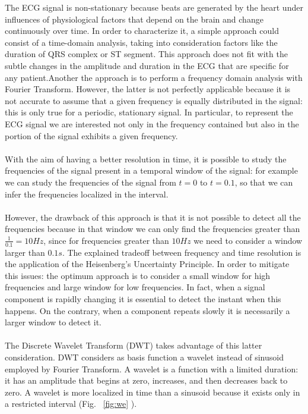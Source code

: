 \documentclass[LaM,binding=0.6cm]{sapthesis}
\begin{document}
The ECG signal is non-stationary because beats are generated by the heart under influences of physiological factors that depend on the brain and change continuously over time. In order to characterize it, a simple approach could consist of a time-domain analysis, taking into consideration factors like the duration of QRS complex or ST segment. This approach does not fit with the subtle changes in the amplitude and duration in the ECG that are specific for any patient.Another the approach is to perform a frequency domain analysis with Fourier Transform. However, the latter is not perfectly applicable because it is not accurate to assume that a given frequency is equally distributed in the signal: this is only true for a periodic, stationary signal. In particular, to represent the ECG signal we are interested not only in the frequency contained but also in the portion of the signal exhibits a given frequency.\\\\With the aim of having a better resolution in time, it is possible to study the frequencies of the signal present in a temporal window of the signal: for example we can study the frequencies of the signal from $t=0$ to $t=0.1$, so that we can infer the frequencies localized in the interval.\\\\However, the drawback of this approach is that it is not possible to detect all the frequencies because in that window we can only find the frequencies greater than $\frac{1}{0.1}=10 Hz$, since for frequencies greater than $10 Hz$ we need to consider a window larger than $0.1s$. The explained tradeoff between frequency and time resolution is the application of the Heisenberg's Uncertainty Principle. In order to mitigate this issues: the optimum approach is to consider a small window for high frequencies and large window for low frequencies. In fact, when a signal component is rapidly changing it is essential to detect the instant when this happens. On the contrary, when a component repeats slowly it is necessarily a larger window to detect it.\\\\The Discrete Wavelet Transform (DWT) takes advantage of this latter consideration. DWT considers as basis function a wavelet instead of sinusoid employed by Fourier Transform. A wavelet is a function with a limited duration: it has an amplitude that begins at zero, increases, and then decreases back to zero. A wavelet is more localized in time than a sinusoid because it exists only in a restricted interval (Fig. ~\ref{fig:we} ). 
\end{document}
